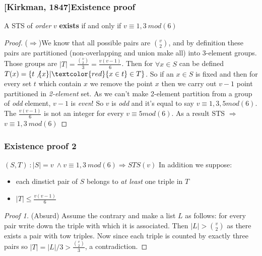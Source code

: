 \begin{frame}
	\frametitle{[Kirkman, 1847]Existence proof}
	\begin{theorem}
		A STS of \textit{order} $v$ \textbf{exists} if and only if $v\equiv 1,3\ mod(6)$  
	\end{theorem}
	\begin{proof}
		($\Rightarrow$)We know that all possible pairs are $\binom{v}{2}$, and by definition these pairs are partitioned (non-overlapping and union make all) into 3-element groups. Those groups are $|T|=\frac{\binom{v}{2}}{3}=\frac{v(v-1)}{6}$. Then for $\forall x \in S$ can be defined $T(x) = \{ t\not\{x\} | \textcolor{red}{x \in t} \in T \}$. So if an $x \in S$ is fixed and then for every set $t$ which contain $x$ we remove the point $x$ then we carry out $v-1$ point partitioned in \textit{2-element} set. As we can't make 2-element partition from a group of \textit{odd} element, $v-1$ is \textit{even}! So $v$ is \textit{odd} and it's equal to say $v \equiv 1,3,5 mod(6)$. The $\frac{v(v-1)}{6}$ is not an integer for every $v \equiv 5 mod(6)$. As a result STS $\Rightarrow$ $v\equiv 1,3\ mod(6)$
	\end{proof}
\end{frame}

\begin{frame}
\frametitle{Existence proof 2}
\begin{block}{$(S,T)\ : |S|=v\ \wedge v\equiv 1,3\ mod(6) \Rightarrow STS(v)$}
	In addition we suppose:
	\begin{itemize}
		\item each dinstict pair of $S$ belongs to \textit{at least} one triple in $T$
		\item $|T| \le \frac{v(v-1)}{6}$
	\end{itemize}
\end{block}
\begin{proof}[Proof 1]
	(Absurd) Assume the contrary and make a list $L$ as follows: for every pair write down the triple with which it is associated. Then $|L|> \binom{v}{2}$ as there exists a pair with tow triples. Now since each triple is counted by exactly three pairs so $|T| =|L|/3 > \frac{\binom{v}{2}}{3}$, a contradiction.
\end{proof}


\end{frame}

